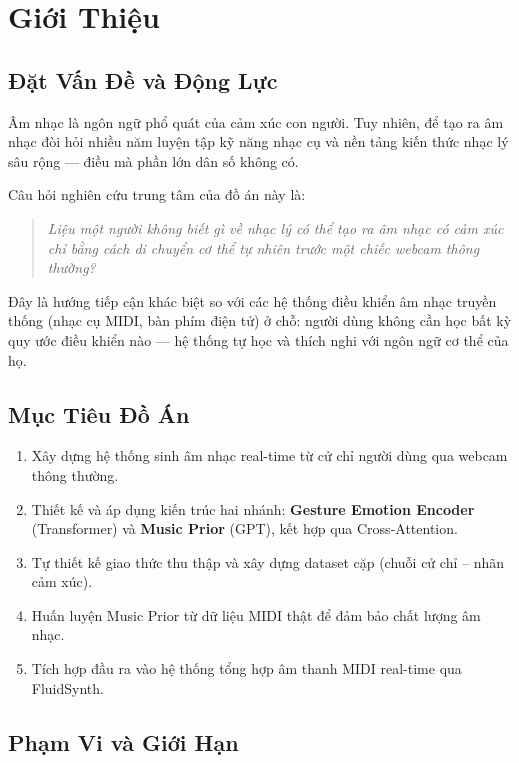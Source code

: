 \chapter{Giới Thiệu}
\label{chap:intro}

\section{Đặt Vấn Đề và Động Lực}

Âm nhạc là ngôn ngữ phổ quát của cảm xúc con người.
Tuy nhiên, để tạo ra âm nhạc đòi hỏi nhiều năm luyện tập kỹ năng nhạc cụ
và nền tảng kiến thức nhạc lý sâu rộng --- điều mà phần lớn dân số không có.

Câu hỏi nghiên cứu trung tâm của đồ án này là:
\begin{quote}
\textit{Liệu một người không biết gì về nhạc lý có thể tạo ra âm nhạc có cảm xúc
chỉ bằng cách di chuyển cơ thể tự nhiên trước một chiếc webcam thông thường?}
\end{quote}

Đây là hướng tiếp cận khác biệt so với các hệ thống điều khiển âm nhạc truyền thống
(nhạc cụ MIDI, bàn phím điện tử) ở chỗ: người dùng không cần học bất kỳ quy ước
điều khiển nào --- hệ thống tự học và thích nghi với ngôn ngữ cơ thể của họ.

\section{Mục Tiêu Đồ Án}

\begin{enumerate}
  \item Xây dựng hệ thống sinh âm nhạc real-time từ cử chỉ người dùng
        qua webcam thông thường.
  \item Thiết kế và áp dụng kiến trúc hai nhánh:
        \textbf{Gesture Emotion Encoder} (Transformer) và
        \textbf{Music Prior} (GPT), kết hợp qua Cross-Attention.
  \item Tự thiết kế giao thức thu thập và xây dựng dataset cặp
        (chuỗi cử chỉ -- nhãn cảm xúc).
  \item Huấn luyện Music Prior từ dữ liệu MIDI thật để đảm bảo
        chất lượng âm nhạc.
  \item Tích hợp đầu ra vào hệ thống tổng hợp âm thanh MIDI
        real-time qua FluidSynth.
\end{enumerate}

\section{Phạm Vi và Giới Hạn}

